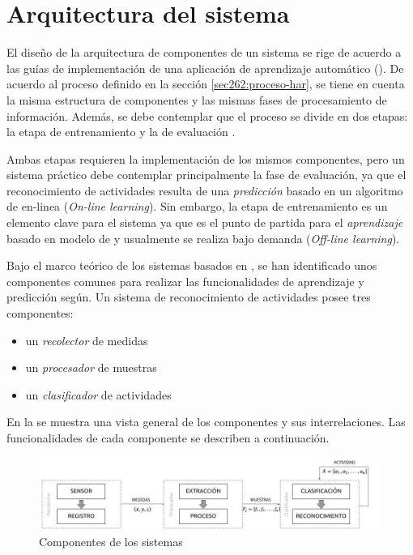 \section{Arquitectura del sistema}

\label{sec42:componentes}El diseño de la arquitectura de componentes
de un sistema  se rige de acuerdo a las guías de implementación
de una aplicación de aprendizaje automático (). De acuerdo
al proceso definido en la sección \ref{sec262:proceso-har}, se tiene
en cuenta la misma estructura de componentes y las mismas fases de
procesamiento de información. Además, se debe contemplar que el proceso
se divide en dos etapas: la etapa de entrenamiento y la de evaluación
\cite{LaraLabrador2013}. 

Ambas etapas requieren la implementación de los mismos componentes,
pero un sistema  práctico debe contemplar principalmente
la fase de evaluación, ya que el reconocimiento de actividades resulta
de una \emph{predicción} basado en un algoritmo de  en-linea
(\emph{On-line learning}). Sin embargo, la etapa de entrenamiento
es un elemento clave para el sistema ya que es el punto de partida
para el \emph{aprendizaje} basado en modelo de  y usualmente
se realiza bajo demanda (\emph{Off-line learning}).

Bajo el marco teórico de los sistemas  basados en ,
se han identificado unos componentes comunes para realizar las funcionalidades
de aprendizaje y predicción según\cite{Choudhury2008}. Un sistema
de reconocimiento de actividades posee tres componentes:
\begin{itemize}
\item un \emph{recolector }de medidas
\item un\emph{ procesador }de muestras 
\item un \emph{clasificador }de actividades
\end{itemize}
En la  se muestra una vista general
de los componentes y sus interrelaciones. Las funcionalidades de cada
componente se describen a continuación. 

\begin{figure}[!tbph]
\centering{}\includegraphics[width=1\linewidth]{capitulo-4/graphics/diagrama_4_1}\caption{Componentes de los sistemas }
\label{fig42:componentes-har}
\end{figure}



